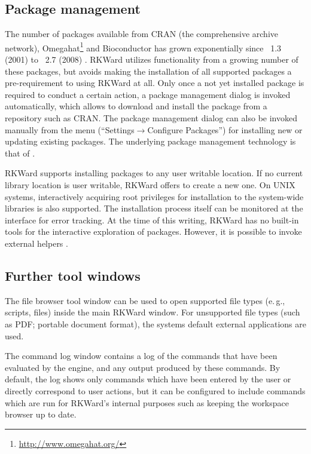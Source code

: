 \subsection{Package management}
\label{sec:package_management}
The number of  packages available from CRAN (the comprehensive  archive
network), Omegahat\footnote{\url{http://www.omegahat.org/}} and Bioconductor \citep{Gentleman2004} has grown exponentially since \, 1.3
(2001) to \, 2.7 (2008) \citep{Fox2008, Ligges2003, Visne2009}. RKWard
utilizes functionality from a growing number of these packages, but avoids
making the installation of all supported packages a pre-requirement to using
RKWard at all. Only once a not yet installed package is required to conduct a certain
action, a package management dialog is invoked automatically, which allows to
download and install the package from a repository such as CRAN. The package
management dialog can also be invoked manually from the menu
(``Settings$\rightarrow$Configure Packages'') for installing new or updating existing 
packages. The underlying package management technology is that of 
\citep{Ligges2003, Ripley2005}.

RKWard supports installing packages to any user writable location. If no current
library location is user writable, RKWard offers to create a new one. 
On UNIX systems, interactively acquiring root privileges for
installation to the system-wide libraries is also supported.
The installation process
itself can be monitored at the interface for error tracking. At the time of this writing, RKWard has no
built-in tools for the interactive exploration of  packages. However, it is
possible to invoke external helpers \citep{Zhang2004}.

\subsection{Further tool windows}
\label{sec:further_tool_windows}

The file browser tool window can be
used to open supported file types (e.\,g., 
scripts,  files) inside the main RKWard
window. For unsupported file types (such as PDF; portable document format), the
systems default external applications are used.

The command log window contains a log of the commands that have been
evaluated by the  engine, and any output
produced by these commands. By default, the log shows only commands
which have been entered by the user or directly correspond to user
actions, but it can be configured to include commands which are run for
RKWard's internal purposes such as keeping the workspace browser up
to date.

